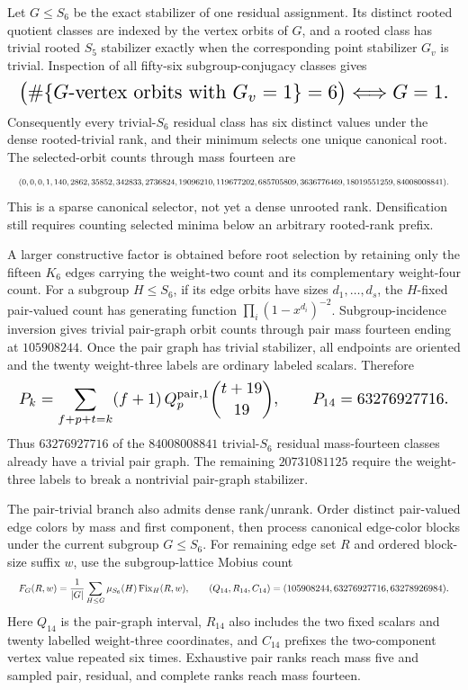 \documentclass{article}
\newcommand{\fitmath}[1]{\resizebox{0.99\linewidth}{!}{$\displaystyle #1$}}
\begin{document}
Let $G\leq S_6$ be the exact stabilizer of one residual assignment. Its distinct
rooted quotient classes are indexed by the vertex orbits of $G$, and a rooted
class has trivial rooted $S_5$ stabilizer exactly when the corresponding point
stabilizer $G_v$ is trivial. Inspection of all fifty-six subgroup-conjugacy
classes gives
\begin{equation}
  \fitmath{%
    \bigl(\#\{G\text{-vertex orbits with }G_v=1\}=6\bigr)
      \Longleftrightarrow G=1.
  }
  \label{eq:optimization-crazy-sextuple-s6-trivial-root-selector}
\end{equation}
Consequently every trivial-$S_6$ residual class has six distinct values under
the dense rooted-trivial rank, and their minimum selects one unique canonical
root. The selected-orbit counts through mass fourteen are
\[
  \fitmath{%
    (0,0,0,1,140,2862,35852,342833,2736824,19096210,119677202,
     685705809,3636776469,18019551259,84008008841).
  }
\]
This is a sparse canonical selector, not yet a dense unrooted rank.
Densification still requires counting selected minima below an arbitrary
rooted-rank prefix.

A larger constructive factor is obtained before root selection by retaining only
the fifteen $K_6$ edges carrying the weight-two count and its complementary
weight-four count. For a subgroup $H\leq S_6$, if its edge orbits have sizes
$d_1,\ldots,d_s$, the $H$-fixed pair-valued count has generating function
$\prod_i(1-x^{d_i})^{-2}$. Subgroup-incidence inversion gives trivial pair-graph
orbit counts through pair mass fourteen ending at $105908244$. Once the pair
graph has trivial stabilizer, all endpoints are oriented and the twenty
weight-three labels are ordinary labeled scalars. Therefore
\begin{equation}
  \fitmath{%
    P_k=\sum_{f+p+t=k}(f+1)\,Q_p^{\mathrm{pair},1}\binom{t+19}{19},
    \qquad P_{14}=63276927716.
  }
  \label{eq:optimization-crazy-sextuple-s6-pair-trivial-factor}
\end{equation}
Thus $63276927716$ of the $84008008841$ trivial-$S_6$ residual mass-fourteen
classes already have a trivial pair graph. The remaining $20731081125$ require
the weight-three labels to break a nontrivial pair-graph stabilizer.

The pair-trivial branch also admits dense rank/unrank. Order distinct
pair-valued edge colors by mass and first component, then process canonical
edge-color blocks
under the current subgroup $G\leq S_6$. For remaining edge set $R$ and ordered
block-size suffix $w$, use the subgroup-lattice Mobius count
\begin{equation}
  \fitmath{%
    F_G(R,w)=\frac{1}{|G|}\sum_{H\leq G}\mu_{S_6}(H)
      \operatorname{Fix}_H(R,w),\qquad
    (Q_{14},R_{14},C_{14})=(105908244,63276927716,63278926984).
  }
  \label{eq:optimization-crazy-sextuple-s6-pair-trivial-ranking}
\end{equation}
Here $Q_{14}$ is the pair-graph interval, $R_{14}$ also includes the two fixed
scalars and twenty labelled weight-three coordinates, and $C_{14}$ prefixes the
two-component vertex value repeated six times. Exhaustive pair ranks reach mass
five and sampled pair, residual, and complete ranks reach mass fourteen.
\end{document}
